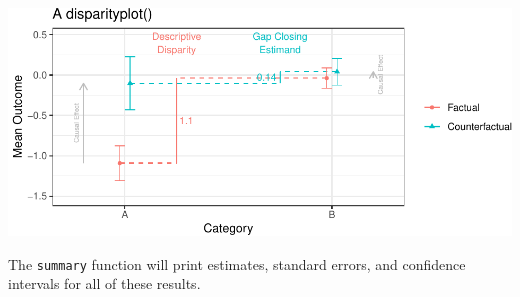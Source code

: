 \documentclass[
]{article}
\begin{document}
\includegraphics{github_doc_files/figure-latex/unnamed-chunk-13-1.pdf}

The \texttt{summary} function will print estimates, standard errors, and confidence intervals for all of these results.
\end{document}
